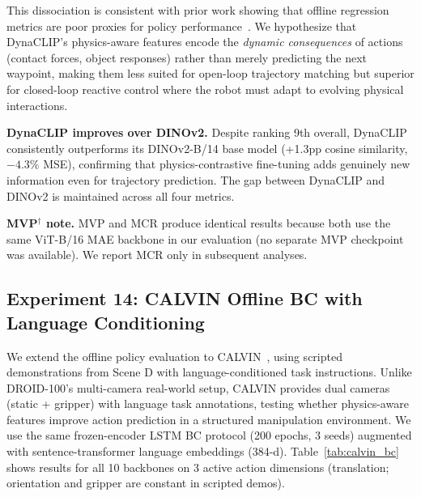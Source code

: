 \documentclass{article}
\newcommand{\methodname}{DynaCLIP}
\begin{document}
This dissociation is consistent with prior work showing that offline regression metrics are poor proxies for policy performance~\cite{mandlekar2021matters}. We hypothesize that \methodname{}'s physics-aware features encode the \emph{dynamic consequences} of actions (contact forces, object responses) rather than merely predicting the next waypoint, making them less suited for open-loop trajectory matching but superior for closed-loop reactive control where the robot must adapt to evolving physical interactions.

\textbf{DynaCLIP improves over DINOv2.} Despite ranking 9th overall, \methodname{} consistently outperforms its DINOv2-B/14 base model (+1.3pp cosine similarity, $-4.3\%$ MSE), confirming that physics-contrastive fine-tuning adds genuinely new information even for trajectory prediction. The gap between DynaCLIP and DINOv2 is maintained across all four metrics.

\textbf{MVP$^\dagger$ note.} MVP and MCR produce identical results because both use the same ViT-B/16 MAE backbone in our evaluation (no separate MVP checkpoint was available). We report MCR only in subsequent analyses.



\subsection{Experiment 14: CALVIN Offline BC with Language Conditioning}
\label{sec:exp_calvin_bc}

We extend the offline policy evaluation to CALVIN~\cite{mees2022calvin}, using scripted demonstrations from Scene D with language-conditioned task instructions. Unlike DROID-100's multi-camera real-world setup, CALVIN provides dual cameras (static + gripper) with language task annotations, testing whether physics-aware features improve action prediction in a structured manipulation environment. We use the same frozen-encoder LSTM BC protocol (200 epochs, 3 seeds) augmented with sentence-transformer language embeddings (384-d). Table~\ref{tab:calvin_bc} shows results for all 10 backbones on 3 active action dimensions (translation; orientation and gripper are constant in scripted demos).
\end{document}
